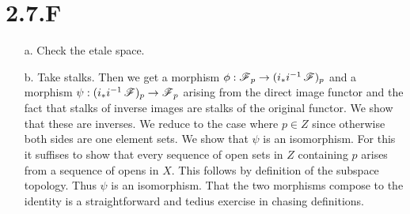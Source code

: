 \documentclass{article}
\begin{document}
\section*{2.7.F}
\begin{itemize}
    \item[a.] Check the etale space.
    \item[b.] Take stalks. Then we get a morphism $\phi:\operatorname{\mathscr{F}}_p \to (i_*i^{-1}\operatorname{\mathscr{F}})_p$
          and a morphism $\psi: (i_*i^{-1}\operatorname{\mathscr{F}})_p \to \operatorname{\mathscr{F}}_p$ arising from the direct image functor
          and the fact that stalks of inverse images are stalks of the original functor.
          We show that these are inverses. We reduce to the case where $p \in Z$ since
          otherwise both sides are one element sets.
          We show that $\psi$ is an isomorphism. For this it suffises to show
          that every sequence of open sets in $Z$ containing $p$ arises from a sequence
          of opens in $X$. This follows by definition of the subspace topology.
          Thus $\psi$ is an isomorphism. That the two morphisms compose to the identity
          is a straightforward and tedius exercise in chasing definitions.
\end{itemize}
\end{document}
